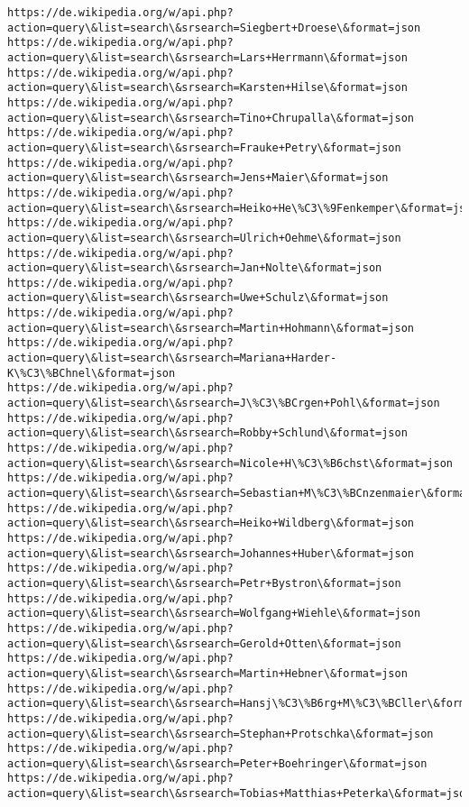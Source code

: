 \documentclass[11pt]{article}
\begin{document}
\begin{Verbatim}[commandchars=\\\{\}]
https://de.wikipedia.org/w/api.php?action=query\&list=search\&srsearch=Siegbert+Droese\&format=json
https://de.wikipedia.org/w/api.php?action=query\&list=search\&srsearch=Lars+Herrmann\&format=json
https://de.wikipedia.org/w/api.php?action=query\&list=search\&srsearch=Karsten+Hilse\&format=json
https://de.wikipedia.org/w/api.php?action=query\&list=search\&srsearch=Tino+Chrupalla\&format=json
https://de.wikipedia.org/w/api.php?action=query\&list=search\&srsearch=Frauke+Petry\&format=json
https://de.wikipedia.org/w/api.php?action=query\&list=search\&srsearch=Jens+Maier\&format=json
https://de.wikipedia.org/w/api.php?action=query\&list=search\&srsearch=Heiko+He\%C3\%9Fenkemper\&format=json
https://de.wikipedia.org/w/api.php?action=query\&list=search\&srsearch=Ulrich+Oehme\&format=json
https://de.wikipedia.org/w/api.php?action=query\&list=search\&srsearch=Jan+Nolte\&format=json
https://de.wikipedia.org/w/api.php?action=query\&list=search\&srsearch=Uwe+Schulz\&format=json
https://de.wikipedia.org/w/api.php?action=query\&list=search\&srsearch=Martin+Hohmann\&format=json
https://de.wikipedia.org/w/api.php?action=query\&list=search\&srsearch=Mariana+Harder-K\%C3\%BChnel\&format=json
https://de.wikipedia.org/w/api.php?action=query\&list=search\&srsearch=J\%C3\%BCrgen+Pohl\&format=json
https://de.wikipedia.org/w/api.php?action=query\&list=search\&srsearch=Robby+Schlund\&format=json
https://de.wikipedia.org/w/api.php?action=query\&list=search\&srsearch=Nicole+H\%C3\%B6chst\&format=json
https://de.wikipedia.org/w/api.php?action=query\&list=search\&srsearch=Sebastian+M\%C3\%BCnzenmaier\&format=json
https://de.wikipedia.org/w/api.php?action=query\&list=search\&srsearch=Heiko+Wildberg\&format=json
https://de.wikipedia.org/w/api.php?action=query\&list=search\&srsearch=Johannes+Huber\&format=json
https://de.wikipedia.org/w/api.php?action=query\&list=search\&srsearch=Petr+Bystron\&format=json
https://de.wikipedia.org/w/api.php?action=query\&list=search\&srsearch=Wolfgang+Wiehle\&format=json
https://de.wikipedia.org/w/api.php?action=query\&list=search\&srsearch=Gerold+Otten\&format=json
https://de.wikipedia.org/w/api.php?action=query\&list=search\&srsearch=Martin+Hebner\&format=json
https://de.wikipedia.org/w/api.php?action=query\&list=search\&srsearch=Hansj\%C3\%B6rg+M\%C3\%BCller\&format=json
https://de.wikipedia.org/w/api.php?action=query\&list=search\&srsearch=Stephan+Protschka\&format=json
https://de.wikipedia.org/w/api.php?action=query\&list=search\&srsearch=Peter+Boehringer\&format=json
https://de.wikipedia.org/w/api.php?action=query\&list=search\&srsearch=Tobias+Matthias+Peterka\&format=json

\end{Verbatim}
\end{document}
